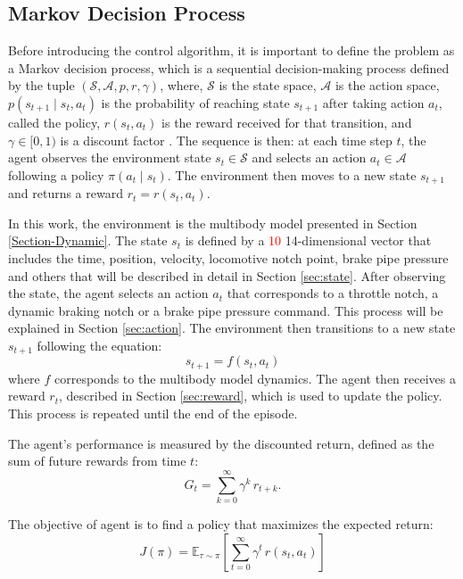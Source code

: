 \documentclass[preprint,10pt]{elsarticle}
\begin{document}
\subsection{Markov Decision Process} \label{sec:markov}

Before introducing the control algorithm, it is important to define the problem as a Markov decision process, which is a sequential decision-making process defined by the tuple $(\mathcal{S}, \mathcal{A}, p, r, \gamma)$, where, $\mathcal{S}$ is the state space, $\mathcal{A}$ is the action space, $p(s_{t+1} \mid s_t, a_t)$ is the probability of reaching state $s_{t+1}$ after taking action $a_t$, called the policy, $r(s_t, a_t)$ is the reward received for that transition, and $\gamma \in [0, 1)$ is a discount factor \citep{Sutton2018Reinforcement}. The sequence is then: at each time step $t$, the agent observes the environment state $s_t \in \mathcal{S}$ and selects an action $a_t \in \mathcal{A}$ following a policy $\pi(a_t \mid s_t)$. The environment then moves to a new state $s_{t+1}$ and returns a reward $r_t = r(s_t, a_t)$. 

In this work, the environment is the multibody model presented in Section \ref{Section-Dynamic}. The state $s_t$ is defined by a \textcolor{red}{10} 14-dimensional vector that includes the time, position, velocity, locomotive notch point, brake pipe pressure and others that will be described in detail in Section \ref{sec:state}. After observing the state, the agent selects an action $a_t$ that corresponds to a throttle notch, a dynamic braking notch or a brake pipe pressure command. This process will be explained in Section \ref{sec:action}. The environment then transitions to a new state $s_{t+1}$ following the equation:
\begin{equation}
    s_{t+1} = f(s_t, a_t)
\end{equation}
where $f$ corresponds to the multibody model dynamics. The agent then receives a reward $r_t$, described in Section \ref{sec:reward}, which is used to update the policy. This process is repeated until the end of the episode.

The agent's performance is measured by the discounted return, defined as the sum of future rewards from time $t$:
\begin{equation}
  G_t = \sum_{k=0}^{\infty} \gamma^k \, r_{t+k}.
\end{equation}

The objective of agent is to find a policy that maximizes the expected return:
\begin{equation}
  J(\pi) = \mathbb{E}_{\tau \sim \pi}\left[\sum_{t=0}^{\infty} \gamma^t \, r(s_t, a_t)\right]
\end{equation}
\end{document}
